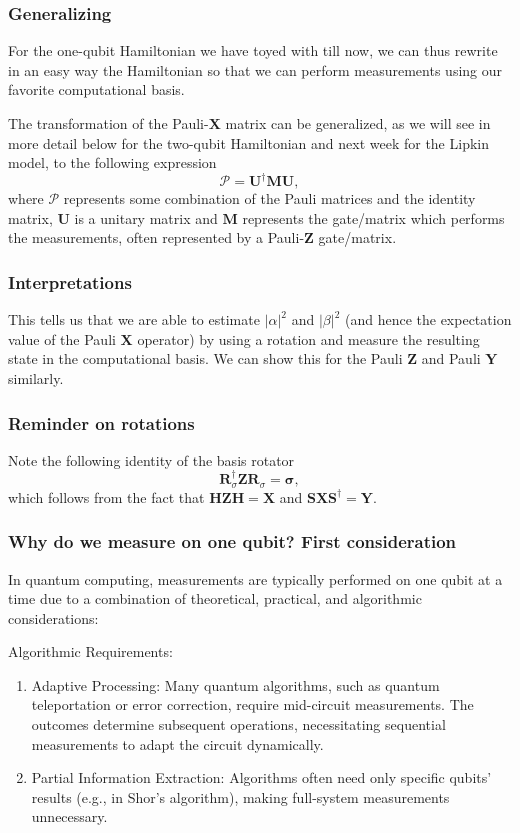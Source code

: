 \documentclass{beamer}
\begin{document}
\begin{frame}
\frametitle{Generalizing}

For the one-qubit Hamiltonian we have toyed with till now, we can thus
rewrite in an easy way the Hamiltonian so that we can perform
measurements using our favorite computational basis.

The transformation of the Pauli-$\bm{X}$ matrix can be generalized, as
we will see in more detail below for the two-qubit Hamiltonian and next week for 
the Lipkin model, to the following expression
\[
\mathcal{P}=\bm{U}^{\dagger}\bm{M}\bm{U},
\]
where $\mathcal{P}$ represents some combination of the Pauli matrices and
the identity matrix, $\bm{U}$ is a unitary matrix and $\bm{M}$
represents the gate/matrix which performs the measurements, often
represented by a Pauli-$\bm{Z}$ gate/matrix.
\end{frame}

\begin{frame}
\frametitle{Interpretations}

This tells us that we are able to estimate $|\alpha|^2$ and
$|\beta|^2$ (and hence the expectation value of the Pauli $\bm{X}$
operator) by using a rotation and measure the
resulting state in the computational basis. We can show this for the
Pauli $\bm{Z}$ and Pauli $\bm{Y}$ similarly.
\end{frame}

\begin{frame}
\frametitle{Reminder on rotations}

Note the following identity of the basis rotator
\[
\bm{R}^\dagger_\sigma \bm{Z} \bm{R}_\sigma = \bm{\sigma,}
\]
which follows from the fact that $\bm{HZH}=\bm{X}$ and $\bm{SXS}^\dagger=\bm{Y}$.
\end{frame}

\begin{frame}
\frametitle{Why do we measure on one qubit? First consideration}

In quantum computing, measurements are typically performed on one
qubit at a time due to a combination of theoretical, practical, and
algorithmic considerations:

\begin{block}{Algorithmic Requirements: }
\begin{enumerate}
\item Adaptive Processing: Many quantum algorithms, such as quantum teleportation or error correction, require mid-circuit measurements. The outcomes determine subsequent operations, necessitating sequential measurements to adapt the circuit dynamically.

\item Partial Information Extraction: Algorithms often need only specific qubits' results (e.g., in Shor's algorithm), making full-system measurements unnecessary.
\end{enumerate}

\noindent
\end{block}
\end{frame}
\end{document}
